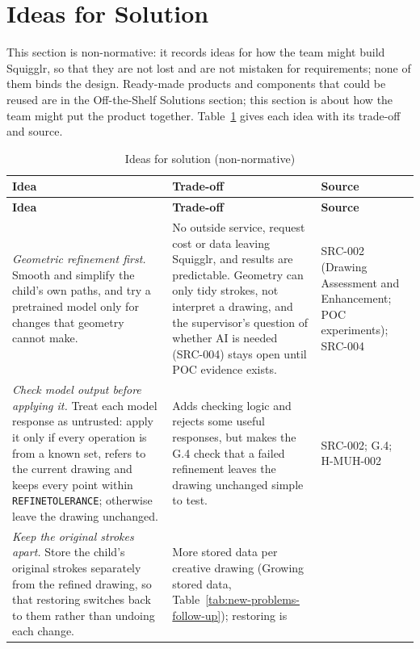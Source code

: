 \documentclass[12pt]{article}
\renewcommand{\_}{\textunderscore\allowbreak}%
\begin{document}
\section{Ideas for Solution}
\label{sec:solution-ideas}
This section is non-normative: it records ideas for how the team might build
Squigglr, so that they are not lost and are not mistaken for requirements; none
of them binds the design. Ready-made products and components that could be
reused are in the Off-the-Shelf Solutions section; this section is about how the
team might put the product together. Table~\ref{tab:solution-ideas} gives each
idea with its trade-off and source.

{\small
\begin{longtable}{@{}>{\raggedright\arraybackslash}p{}%
>{\raggedright\arraybackslash}p{}%
>{\raggedright\arraybackslash}p{}@{}} \caption{Ideas for solution
(non-normative)}\label{tab:solution-ideas}\\
\toprule
\textbf{Idea} & \textbf{Trade-off} & \textbf{Source} \\
\midrule
\endfirsthead
\toprule
\textbf{Idea} & \textbf{Trade-off} & \textbf{Source} \\
\midrule
\endhead
\bottomrule
\endlastfoot
\emph{Geometric refinement first.} Smooth and simplify the child's own paths,
and try a pretrained model only for changes that geometry cannot make. & No
outside service, request cost or data leaving Squigglr, and results are
predictable. Geometry can only tidy strokes, not interpret a drawing, and the
supervisor's question of whether AI is needed (SRC-004) stays open until POC
evidence exists. & SRC-002 (Drawing Assessment and Enhancement; POC
experiments); SRC-004 \\
\addlinespace
\emph{Check model output before applying it.} Treat each model response as
untrusted: apply it only if every operation is from a known set, refers to the
current drawing and keeps every point within \texttt{REFINE\_TOLERANCE};
otherwise leave the drawing unchanged. & Adds checking logic and rejects some
useful responses, but makes the G.4 check that a failed refinement leaves the
drawing unchanged simple to test. & SRC-002; G.4; H-MUH-002 \\
\addlinespace
\emph{Keep the original strokes apart.} Store the child's original strokes
separately from the refined drawing, so that restoring switches back to them
rather than undoing each change. & More stored data per creative drawing
(Growing stored data, Table~\ref{tab:new-problems-follow-up}); restoring is

\end{longtable}}
\end{document}

